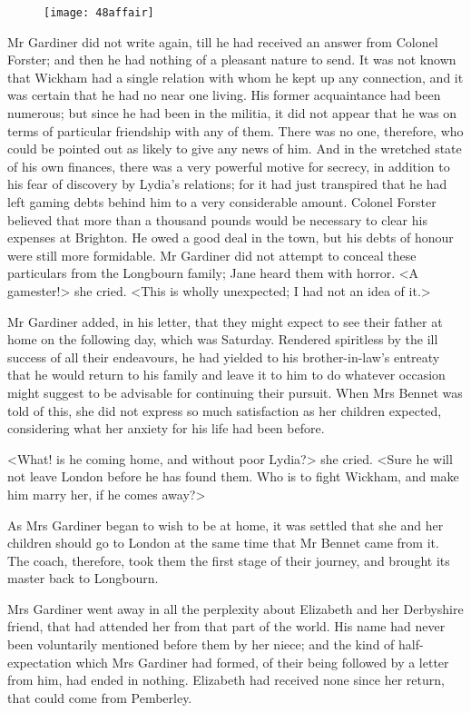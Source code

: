 \begin{figure}[tbh]
\centering
\texttt{[image: 48affair]}
\end{figure}

Mr Gardiner did not write again, till he had received an answer from Colonel Forster; and then he had nothing of a pleasant nature to send. It was not known that Wickham had a single relation with whom he kept up any connection, and it was certain that he had no near one living. His former acquaintance had been numerous; but since he had been in the militia, it did not appear that he was on terms of particular friendship with any of them. There was no one, therefore, who could be pointed out as likely to give any news of him. And in the wretched state of his own finances, there was a very powerful motive for secrecy, in addition to his fear of discovery by Lydia's relations; for it had just transpired that he had left gaming debts behind him to a very considerable amount. Colonel Forster believed that more than a thousand pounds would be necessary to clear his expenses at Brighton. He owed a good deal in the town, but his debts of honour were still more formidable. Mr Gardiner did not attempt to conceal these particulars from the Longbourn family; Jane heard them with horror. <A gamester!> she cried. <This is wholly unexpected; I had not an idea of it.>

Mr Gardiner added, in his letter, that they might expect to see their father at home on the following day, which was Saturday. Rendered spiritless by the ill success of all their endeavours, he had yielded to his brother-in-law's entreaty that he would return to his family and leave it to him to do whatever occasion might suggest to be advisable for continuing their pursuit. When Mrs Bennet was told of this, she did not express so much satisfaction as her children expected, considering what her anxiety for his life had been before.

<What! is he coming home, and without poor Lydia?> she cried. <Sure he will not leave London before he has found them. Who is to fight Wickham, and make him marry her, if he comes away?>

As Mrs Gardiner began to wish to be at home, it was settled that she and her children should go to London at the same time that Mr Bennet came from it. The coach, therefore, took them the first stage of their journey, and brought its master back to Longbourn.

Mrs Gardiner went away in all the perplexity about Elizabeth and her Derbyshire friend, that had attended her from that part of the world. His name had never been voluntarily mentioned before them by her niece; and the kind of half-expectation which Mrs Gardiner had formed, of their being followed by a letter from him, had ended in nothing. Elizabeth had received none since her return, that could come from Pemberley.

